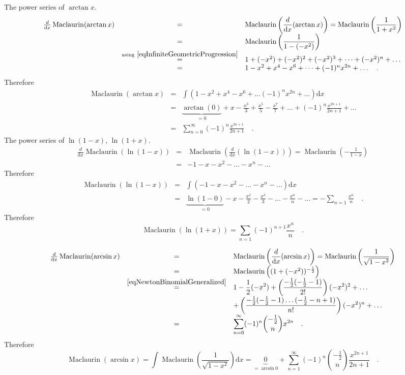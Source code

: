 \documentclass[12pt]{book}
\newcommand{\diff}{\text{d}}
\DeclareMathOperator{\maclaurin}{Maclaurin}
\begin{document}
The power series of $\arctan x$.
\[
\begin{array}{rcl}
\frac{d}{\diff x}\maclaurin (\arctan x)&=& \displaystyle \maclaurin\left( \frac{d}{\diff x}(\arctan x)\right)= \maclaurin \left(\frac{1}{1+x^2}\right) \\ 
&=&\displaystyle \maclaurin \left(\frac{1}{1-(-x^2)}\right)\\
& \stackrel{\mathrm{using~} \eqref{eqInfiniteGeometricProgression} }{=} & 1+(-x^2)+(-x^2)^2+(-x^2)^3+\dots+ (-x^2)^n+\dots
\\ &=& 1-x^2+x^4-x^6+\dots+ (-1)^nx^{2n}+\dots \quad .
\end{array}
\]
Therefore 
\[
\begin{array}{rcl}
\maclaurin (\arctan x)&=&\displaystyle \int( 1-x^2+x^4-x^6+\dots (-1)^nx^{2n}+\dots )\diff x \\
&=&\displaystyle  \underbrace{\arctan(0)}_{=0}+ x-\frac{x^3}3+\frac{x^5}5-\frac{x^7}7+\dots +(-1)^n\frac{x^{2n+1}}{2n+1}+\dots\\
&=&\displaystyle  \sum_{n=0}^{\infty} (-1)^n\frac{x^{2n+1}}{2n+1}\quad .
\end{array}
\]
The power series of $\ln (1-x)$, $\ln(1+x)$.
\[
\begin{array}{rcl}
\displaystyle \frac{d}{\diff x}\maclaurin(\ln (1-x))&=& \displaystyle \maclaurin \left(\frac{d}{\diff x}(\ln (1-x))\right) = \maclaurin \left(-\frac{1}{1-x}\right)\\
&=& \displaystyle -1-x-x^2-\dots -x^n-\dots
\end{array}
\]
Therefore 
\[
\begin{array}{rcl}
\displaystyle \maclaurin(\ln (1-x) )&=&\displaystyle \int (-1-x-x^2-\dots -x^n-\dots)\diff x \\&=&\displaystyle \underbrace{\ln (1-0)}_{=0} - x- \frac{x^2}{2}- \frac{x^3}{3}-\dots - \frac{x^n}{n}-\dots= -\displaystyle\sum_{n=1}\frac{x^n}{n} \quad .
\end{array}
\]
Therefore 
\[
\maclaurin(\ln (1+x) )=\sum_{n=1}(-1)^{n+1}\frac{x^n}{n}\quad .
\]

\[
\begin{array}{rcl}
\frac{d}{\diff x}\maclaurin(\arcsin{x})&=&\displaystyle \maclaurin\left(\frac{d}{\diff x}(\arcsin{x})\right)= \maclaurin\left(\frac{1}{\sqrt{1-x^2}}\right)\\
&=&
\maclaurin\left((1+(-x^2))^{-\frac{1}2}\right)\\
&\stackrel{\eqref{eqNewtonBinomialGeneralized}}{=}&\displaystyle 1-\frac{1}{2}(-x^{2})+ \left(\frac{-\frac{1}{2}(-\frac{1}2-1)}{2!}\right)(-x^2)^2+ \dots\\
&&\displaystyle + \left(\frac{-\frac{1}{2}(-\frac{1}2-1)\dots (-\frac{1}2-n+1)}{n!}\right)(-x^2)^n+\dots 
\\
&=& \displaystyle\sum\limits_{n=0}^{\infty} (-1)^n \binom{-\frac{1}{2}}{n} x^{2n}\quad .
\end{array}
\]
Therefore 
\[
\maclaurin(\arcsin x)=\int \maclaurin\left(\frac{1}{\sqrt{1-x^2}}\right) \diff x =\underbrace{0}_{=\arcsin 0} +\sum_{n=1}^{\infty} (-1)^n \binom{-\frac{1}{2}}{n} \frac{x^{2n+1}}{2n+1}\quad .
\]
\end{document}
